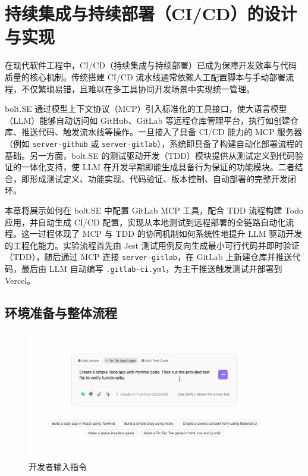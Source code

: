 
\chapter{持续集成与持续部署（CI/CD）的设计与实现}
\label{chap:mcp-tdd-cicd}

在现代软件工程中，CI/CD（持续集成与持续部署）已成为保障开发效率与代码质量的核心机制。传统搭建 CI/CD 流水线通常依赖人工配置脚本与手动部署流程，不仅繁琐易错，且难以在多工具协同开发场景中实现统一管理。

bolt.SE 通过模型上下文协议（MCP）引入标准化的工具接口，使大语言模型（LLM）能够自动访问如 GitHub、GitLab 等远程仓库管理平台，执行如创建仓库、推送代码、触发流水线等操作。一旦接入了具备 CI/CD 能力的 MCP 服务器（例如 \texttt{server-github} 或 \texttt{server-gitlab}），系统即具备了构建自动化部署流程的基础。另一方面，bolt.SE 的测试驱动开发（TDD）模块提供从测试定义到代码验证的一体化支持，使 LLM 在开发早期即能生成具备行为保证的功能模块。二者结合，即形成测试定义、功能实现、代码验证、版本控制、自动部署的完整开发闭环。

本章将展示如何在 bolt.SE 中配置 GitLab MCP 工具，配合 TDD 流程构建 Todo 应用，并自动生成 CI/CD 配置，实现从本地测试到远程部署的全链路自动化流程。这一过程体现了 MCP 与 TDD 的协同机制如何系统性地提升 LLM 驱动开发的工程化能力。实验流程首先由 Jest 测试用例反向生成最小可行代码并即时验证（TDD），随后通过 MCP 连接 \texttt{server-gitlab}，在 GitLab 上新建仓库并推送代码，最后由 LLM 自动编写 \texttt{.gitlab-ci.yml}，为主干推送触发测试并部署到 Vercel。

\section{环境准备与整体流程}
\label{sec:cicd-overview}

\begin{figure}
    \centering
    \includegraphics[width=\textwidth]{figures/screenshots/ci-cd/ci_prompt.png}
    \caption{开发者输入指令}
    \label{fig:ci_prompt}
\end{figure}

